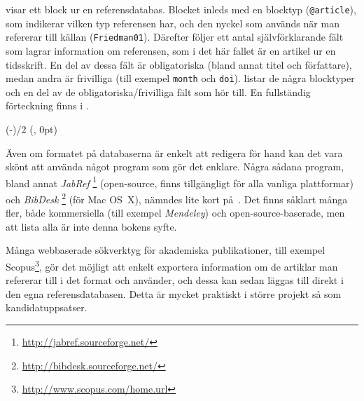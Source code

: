 \documentclass[10pt,../../a4.tex]{subfiles}
\begin{document}
 visar ett block ur en referensdatabas. Blocket inleds
med en blocktyp (\texttt{@article}), som indikerar vilken typ referensen
har, och den nyckel som används när man refererar till källan
(\texttt{Friedman01}). Därefter följer ett antal självförklarande
fält som lagrar information om referensen, som i det här fallet är en
artikel ur en tidsskrift. En del av dessa fält är obligatoriska (bland
annat titel och författare), medan andra är frivilliga (till exempel
\texttt{month} och \texttt{doi}).  listar de några
blocktyper och en del av de obligatoriska/frivilliga fält som hör till.
En fullständig förteckning finns i \textcite[7\psqq]{Lehman13}.

\begin{table}[p]
	\begin{minipage}[][0.98\textheight][t]{0.98\textwidth}
		\def\r{\textcolor{black}{\textsf{+}}}
		\def\o{\textcolor{lightgray}{\textsf{+}}}
		\def\u{}
		\centering
		\caption{%
			Några av referenstyperna i  och en del av
			deras tillhörande fält.
			Både typnamn och fältnamn är relativt självförklarande,
			men se \textcite[7\psqq]{Lehman13} för mer information.
			\emph{Nyckel:} {\r} obligatoriskt,
			{\o} valfritt fält.%
		}
		\label{tab:blocktyper}
		\NewCoffin\TableCoffin
		\SetHorizontalCoffin\TableCoffin{
			
		}
		\newlength\tablecoffinwidth
		\setlength\tablecoffinwidth%
			{(\textwidth-\CoffinWidth\TableCoffin)/2}
		\TypesetCoffin\TableCoffin[t, l](\tablecoffinwidth, 0pt)
	\end{minipage}
\end{table}

Även om formatet på databaserna är enkelt att redigera för hand kan det
vara skönt att använda något program som gör det enklare. Några sådana
program, bland annat \emph{JabRef}%
\footnote{\url{http://jabref.sourceforge.net/}} (open-source, finns 
tillgängligt för alla vanliga plattformar) och \emph{BibDesk}%
\footnote{\url{http://bibdesk.sourceforge.net/}} (för Mac OS~X), nämndes
lite kort på~. Det finns såklart många fler, både
kommersiella (till exempel \emph{Mendeley}) och open-source-baserade, 
men att lista alla är inte denna bokens syfte.

Många webbaserade sökverktyg för akademiska publikationer, till exempel
Scopus\footnote{\url{http://www.scopus.com/home.url}}, gör det möjligt att
enkelt exportera information om de artiklar man refererar till i det
format \BibTeX{} och  använder, och dessa kan sedan
läggas till direkt i den egna referensdatabasen.
Detta är mycket praktiskt i större projekt så som kandidatuppsatser.
\end{document}
